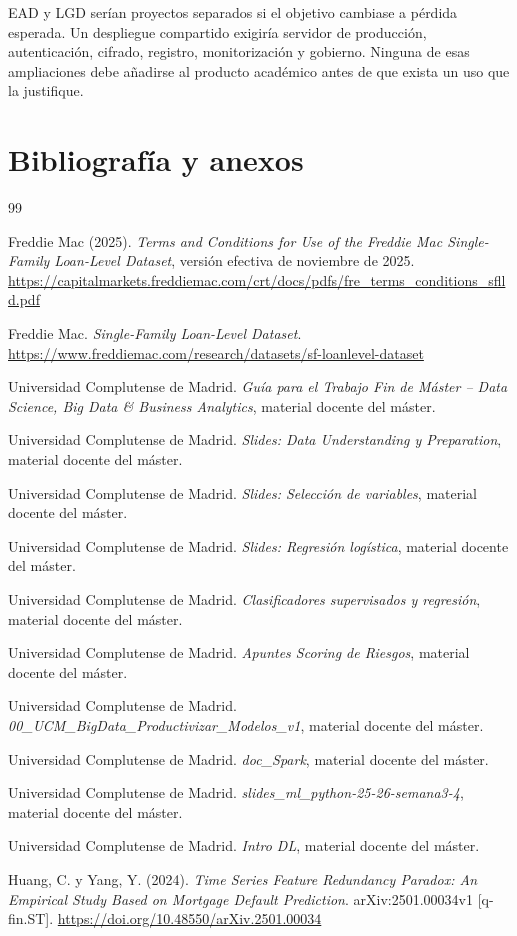 \documentclass[10pt,a4paper]{article}
\begin{document}
EAD y LGD serían proyectos separados si el objetivo cambiase a pérdida esperada.
Un despliegue compartido exigiría servidor de producción, autenticación,
cifrado, registro, monitorización y gobierno. Ninguna de esas ampliaciones debe
añadirse al producto académico antes de que exista un uso que la justifique.

\clearpage
\section{Bibliografía y anexos}

\renewcommand{\refname}{Bibliografía}
\begin{thebibliography}{99}

Freddie Mac (2025).
\textit{Terms and Conditions for Use of the Freddie Mac Single-Family
Loan-Level Dataset}, versión efectiva de noviembre de 2025.
\url{https://capitalmarkets.freddiemac.com/crt/docs/pdfs/fre_terms_conditions_sflld.pdf}

Freddie Mac.
\textit{Single-Family Loan-Level Dataset}.
\url{https://www.freddiemac.com/research/datasets/sf-loanlevel-dataset}

Universidad Complutense de Madrid.
\textit{Guía para el Trabajo Fin de Máster -- Data Science, Big Data \&
Business Analytics}, material docente del máster.

Universidad Complutense de Madrid.
\textit{Slides: Data Understanding y Preparation}, material docente del máster.

Universidad Complutense de Madrid.
\textit{Slides: Selección de variables}, material docente del máster.

Universidad Complutense de Madrid.
\textit{Slides: Regresión logística}, material docente del máster.

Universidad Complutense de Madrid.
\textit{Clasificadores supervisados y regresión}, material docente del máster.

Universidad Complutense de Madrid.
\textit{Apuntes Scoring de Riesgos}, material docente del máster.

Universidad Complutense de Madrid.
\textit{00\_UCM\_BigData\_Productivizar\_Modelos\_v1}, material docente del
máster.

Universidad Complutense de Madrid.
\textit{doc\_Spark}, material docente del máster.

Universidad Complutense de Madrid.
\textit{slides\_ml\_python-25-26-semana3-4}, material docente del máster.

Universidad Complutense de Madrid.
\textit{Intro DL}, material docente del máster.

Huang, C. y Yang, Y. (2024).
\textit{Time Series Feature Redundancy Paradox: An Empirical Study Based on
Mortgage Default Prediction}. arXiv:2501.00034v1 [q-fin.ST].
\url{https://doi.org/10.48550/arXiv.2501.00034}

\end{thebibliography}
\end{document}
